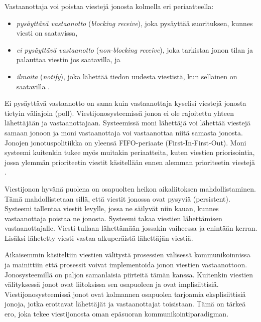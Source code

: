 Vastaanottaja voi poistaa viestejä jonosta kolmella eri periaatteella:
\begin{itemize}
	\item \emph{pysäyttävä vastaanotto} (\emph{blocking receive}), joka pysäyttää suorituksen, kunnes viesti on saatavissa,
	\item \emph{ei pysäyttävä vastaanotto} (\emph{non-blocking receive}), joka tarkistaa jonon tilan ja palauttaa viestin jos saatavilla, ja
	\item \emph{ilmoita} (\emph{notify}), joka lähettää tiedon uudesta viestistä, kun sellainen on saatavilla \cite[s.~254]{distributed-systems-concepts-and-design}.
\end{itemize}
Ei pysäyttävä vastaanotto on sama kuin vastaanottaja kyselisi viestejä jonosta tietyin väliajoin (poll). Viestijonosysteemissä jonoa ei ole rajoitettu yhteen lähettäjään ja vastaanottajaan. Systeemissä moni lähettäjä voi lähettää viestejä samaan jonoon ja moni vastaanottaja voi vastaanottaa niitä samasta jonosta. Jonojen jonotuspolitiikka on yleensä FIFO-periaate (First-In-First-Out). Moni systeemi kuitenkin tukee myös muitakin periaatteita, kuten viestien priorisointia, jossa ylemmän prioriteetin viestit käsitellään ennen alemman prioriteetin viestejä \cite[s.~120]{eugster2003many}.

Viestijonon hyvänä puolena on osapuolten heikon aikaliitoksen mahdollistaminen. Tämä mahdollistetaan sillä, että viestit jonossa ovat pysyviä (persistent). Systeemi tallentaa viestit levylle, jossa ne säilyvät niin kauan, kunnes vastaanottaja poistaa ne jonosta. Systeemi takaa viestien lähettämisen vastaanottajalle. Viesti tullaan lähettämään jossakin vaiheessa ja enintään kerran. Lisäksi lähetetty viesti vastaa alkuperäistä lähettäjän viestiä. \mbox{\cite[s.~255]{distributed-systems-concepts-and-design}}

Aikaisemmin käsiteltiin viestien välitystä prosessien välisessä kommunikoinnissa ja mainittiin että prosessit voivat implementoida jonon viestien vastaanottoon. Jonosysteemillä on paljon samanlaisia piirteitä tämän kanssa. Kuitenkin viestien välityksessä jonot ovat liitoksissa sen osapuoleen ja ovat implisiittisiä. Viestijonosysteemissä jonot ovat kolmannen osapuolen tarjoamia eksplisiittisiä jonoja, jotka erottavat lähettäjät ja vastaanottajat toisistaan. Tämä on tärkeä ero, joka tekee viestijonosta oman epäsuoran kommunikointiparadigman. \mbox{\cite[s.~256]{distributed-systems-concepts-and-design}}

